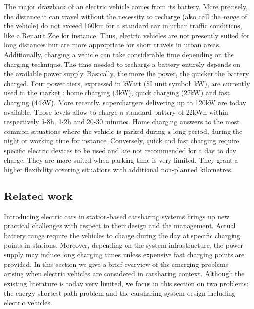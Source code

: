 \begin{bibunit}[ieeetr]
\medskip
The major drawback of an electric vehicle comes from its battery.
More precisely, the distance it can travel without the necessity to recharge (also call the \emph{range} of the vehicle) do not exceed 160km for a standard car in urban traffic conditions, like a Renault Zoe for instance.
Thus, electric vehicles are not presently suited for long distances but are more appropriate for short travels in urban areas.
Additionally, charging a vehicle can take considerable time depending on the charging technique.
The time needed to recharge a battery entirely depends on the available power supply.
Basically, the more the power, the quicker the battery charged.
Four power tiers, expressed in kWatt (SI unit symbol: kW), are currently used in the market \cite{livre_vert_2014}: home charging (3kW), quick charging (22kW) and fast charging (44kW).
More recently, superchargers delivering up to 120kW are today available.
Those levels allow to charge a standard battery of 22kWh within respectively 6-8h, 1-2h and 20-30 minutes.
Home charging answers to the most common situations where the vehicle is parked during a long period, during the night or working time for instance.
Conversely, quick and fast charging require specific electric devices to be used and are not recommended for a day to day charge.
They are more suited when parking time is very limited.
They grant a higher flexibility covering situations with additional non-planned kilometres.

\subsection{Related work}

Introducing electric cars in station-based carsharing systems brings up new practical challenges with respect to their design and the management.
Actual battery range require the vehicles to charge during the day at specific charging points in stations.
Moreover, depending on the system infrastructure, the power supply may induce long charging times unless expensive fast charging points are provided.
In this section we give a brief overview of the emerging problems arising when electric vehicles are considered in carsharing context.
Although the existing literature is today very limited, we focus in this section on two problems: the energy shortest path problem and the carsharing system design including electric vehicles. 



\end{bibunit}
